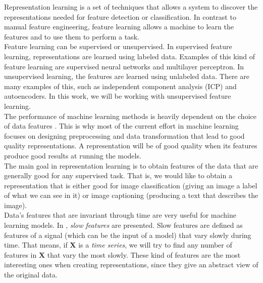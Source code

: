 Representation learning is a set of techniques that allows a system to discover the representations needed for feature detection or classification. 
In contrast to manual feature engineering, feature learning allows a machine to learn the features and to use them to perform a task.\\

Feature learning can be supervised or unsupervised. In supervised feature learning, representations are learned using labeled data.
Examples of this kind of feature learning are supervised neural networks and multilayer perceptron. In unsupervised learning, the features are learned using unlabeled data. 
There are many examples of this, such as independent component analysis (ICP) and autoencoders. In this work, we will be working with unsupervised feature learning.\\

The performance of machine learning methods is heavily dependent on the choice of data features \citep{bengio_representation_2014}. This is why most of the current 
effort in machine learning focuses on designing preprocessing and data transformation that lead to good quality representations. A representation will be of good quality when its features
produce good results at running the models.\\

The main goal in representation learning is to obtain features of the data that are generally good for any supervised task. That is, we would like to obtain
a representation that is either good for image classification (giving an image a label of what we can see in it) or image captioning (producing a text that describes the image).\\

Data's features that are invariant through time are very useful for machine learning models. In \cite{wiskott_slow_2002}, \emph{slow features} are presented. Slow features are defined as features of a signal 
(which can be the input of a model) that vary slowly during time. That means, if $\bm{X}$ is a \emph{time series}\footnotemark, we will try to find any number of features in $\bm{X}$ that vary the most slowly. These kind of features are the most interesting ones when creating representations, since they give an abstract view of the original data.\\



